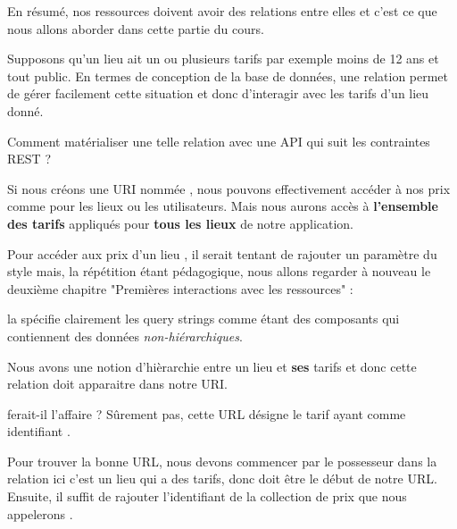 \documentclass[big]{zmdocument}
\begin{document}
En résumé, nos ressources doivent avoir des relations entre elles et c'est ce que nous allons aborder dans cette partie du cours.







Supposons qu'un lieu ait un ou plusieurs tarifs par exemple moins de 12 ans et tout public.
En termes de conception de la base de données, une relation  permet de gérer facilement cette situation et donc d'interagir avec les tarifs d'un lieu donné.



\begin{Question}
Comment matérialiser une telle relation avec une API qui suit les contraintes REST ?
\end{Question}


Si nous créons une URI nommée , nous pouvons effectivement accéder à nos prix comme pour les lieux ou les utilisateurs. Mais nous aurons accès à \textbf{l'ensemble des tarifs} appliqués pour \textbf{tous les lieux} de notre application.



Pour accéder aux prix d'un lieu , il serait tentant de rajouter un paramètre du style  mais, la répétition étant pédagogique, nous allons regarder à nouveau le deuxième chapitre "Premières interactions avec les ressources" :



\begin{Quotation}
la  spécifie clairement les query strings comme étant des composants qui contiennent des données \textit{non-hiérarchiques}.
\end{Quotation}



Nous avons une notion d'hièrarchie entre un lieu et \textbf{ses} tarifs et donc cette relation doit apparaitre dans notre URI.



 ferait-il l'affaire ? Sûrement pas, cette URL désigne le tarif ayant comme identifiant .



Pour trouver la bonne URL, nous devons commencer par le possesseur dans la relation ici c'est un lieu qui a des tarifs, donc  doit être le début de notre URL. Ensuite, il suffit de rajouter l'identifiant de la collection de prix que nous appelerons .
\end{document}
